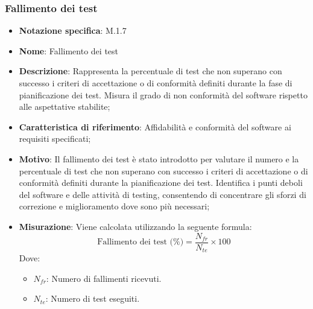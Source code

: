 \subsubsection{Fallimento dei test}
\begin{itemize}
    \item \textbf{Notazione specifica}: M.1.7
    \item \textbf{Nome}: Fallimento dei test
    \item \textbf{Descrizione}: Rappresenta la percentuale di test che non superano con successo i criteri di accettazione o di conformità definiti durante la fase di pianificazione dei test. Misura il grado di non conformità del software rispetto alle aspettative stabilite;
    \item \textbf{Caratteristica di riferimento}: Affidabilità e conformità del software ai requisiti specificati;
    \item \textbf{Motivo}: Il fallimento dei test è stato introdotto per valutare il numero e la percentuale di test che non superano con successo i criteri di accettazione o di conformità definiti durante la pianificazione dei test. Identifica i punti deboli del software e delle attività di testing, consentendo di concentrare gli sforzi di correzione e miglioramento dove sono più necessari;
    \item \textbf{Misurazione}: Viene calcolata utilizzando la seguente formula:
    \[
    \text{Fallimento dei test (\%)} = \frac{N_{fr}}{N_{te}} \times 100
    \]
    Dove:
    \begin{itemize}
        \item $N_{fr}$: Numero di fallimenti ricevuti.
        \item $N_{te}$: Numero di test eseguiti.
    \end{itemize}
\end{itemize}